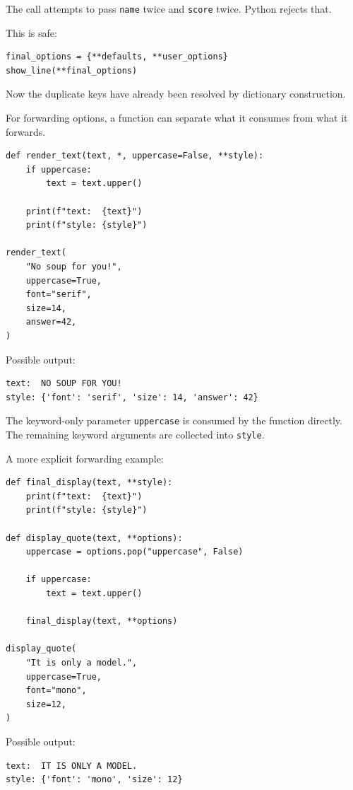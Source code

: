 The call attempts to pass \texttt{name} twice and \texttt{score} twice. Python rejects that.

This is safe:

\begin{verbatim}
final_options = {**defaults, **user_options}
show_line(**final_options)
\end{verbatim}

Now the duplicate keys have already been resolved by dictionary construction.

For forwarding options, a function can separate what it consumes from what it forwards.

\begin{verbatim}
def render_text(text, *, uppercase=False, **style):
    if uppercase:
        text = text.upper()

    print(f"text:  {text}")
    print(f"style: {style}")

render_text(
    "No soup for you!",
    uppercase=True,
    font="serif",
    size=14,
    answer=42,
)
\end{verbatim}

Possible output:

\begin{verbatim}
text:  NO SOUP FOR YOU!
style: {'font': 'serif', 'size': 14, 'answer': 42}
\end{verbatim}

The keyword-only parameter \texttt{uppercase} is consumed by the function directly. The remaining keyword arguments are collected into \texttt{style}.

A more explicit forwarding example:

\begin{verbatim}
def final_display(text, **style):
    print(f"text:  {text}")
    print(f"style: {style}")

def display_quote(text, **options):
    uppercase = options.pop("uppercase", False)

    if uppercase:
        text = text.upper()

    final_display(text, **options)

display_quote(
    "It is only a model.",
    uppercase=True,
    font="mono",
    size=12,
)
\end{verbatim}

Possible output:

\begin{verbatim}
text:  IT IS ONLY A MODEL.
style: {'font': 'mono', 'size': 12}
\end{verbatim}

